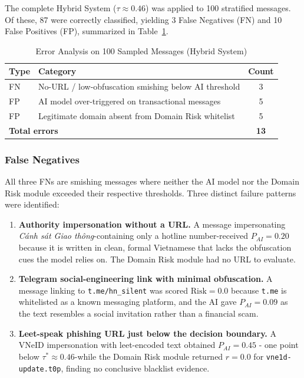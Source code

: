 \documentclass[conference]{IEEEtran}
\begin{document}
The complete Hybrid System ($\tau \approx 0.46$) was applied to
100 stratified messages. Of these, 87 were correctly
classified, yielding 3 False Negatives (FN) and
10 False Positives (FP), summarized in Table~\ref{tab:error}.
 
\begin{table}[htbp]
  \caption{Error Analysis on 100 Sampled Messages (Hybrid System)}
  \label{tab:error}
  \centering
  \begin{tabular}{llc}
    \toprule
    \textbf{Type} & \textbf{Category} & \textbf{Count} \\
    \midrule
    FN & No-URL / low-obfuscation smishing below AI threshold & 3 \\
    \midrule
    FP & AI model over-triggered on transactional messages   & 5 \\
    FP & Legitimate domain absent from Domain Risk whitelist & 5 \\
    \midrule
    \multicolumn{2}{l}{\textbf{Total errors}} & \textbf{13} \\
    \bottomrule
  \end{tabular}
\end{table}
 
\subsubsection*{False Negatives}
All three FNs are smishing messages where neither the AI model nor the Domain
Risk module exceeded their respective thresholds. Three distinct failure
patterns were identified:
\begin{enumerate}
  \item \textbf{Authority impersonation without a URL.} A message
        impersonating \textit{C\'{a}nh s\'{a}t Giao th\^{o}ng}-containing
        only a hotline number-received $P_{AI}{=}0.20$ because it is
        written in clean, formal Vietnamese that lacks the obfuscation cues
        the model relies on. The Domain Risk module had no URL to evaluate.
  \item \textbf{Telegram social-engineering link with minimal obfuscation.}
        A message linking to \texttt{t.me/hn\_silent} was scored
        $\text{Risk}{=}0.0$ because \texttt{t.me} is whitelisted as a known
        messaging platform, and the AI gave $P_{AI}{=}0.09$ as the text
        resembles a social invitation rather than a financial scam.
  \item \textbf{Leet-speak phishing URL just below the decision boundary.}
        A VNeID impersonation with leet-encoded text obtained
        $P_{AI}{=}0.45$ - one point below $\tau^{*}{\approx}0.46$-while
        the Domain Risk module returned $r{=}0.0$ for
        \texttt{vne1d-update.t0p}, finding no conclusive blacklist evidence.
\end{enumerate}
\end{document}
